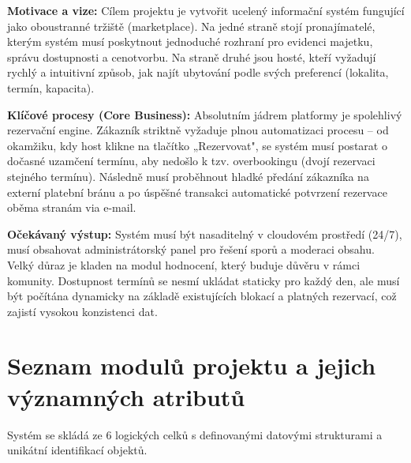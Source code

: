 \documentclass[11pt, a4paper]{article}
\begin{document}
\textbf{Motivace a vize:}
Cílem projektu je vytvořit ucelený informační systém fungující jako oboustranné tržiště (marketplace). Na jedné straně stojí pronajímatelé, kterým systém musí poskytnout jednoduché rozhraní pro evidenci majetku, správu dostupnosti a cenotvorbu. Na straně druhé jsou hosté, kteří vyžadují rychlý a intuitivní způsob, jak najít ubytování podle svých preferencí (lokalita, termín, kapacita).

\textbf{Klíčové procesy (Core Business):}
Absolutním jádrem platformy je spolehlivý rezervační engine. Zákazník striktně vyžaduje plnou automatizaci procesu -- od okamžiku, kdy host klikne na tlačítko „Rezervovat", se systém musí postarat o dočasné uzamčení termínu, aby nedošlo k tzv. overbookingu (dvojí rezervaci stejného termínu). Následně musí proběhnout hladké předání zákazníka na externí platební bránu a po úspěšné transakci automatické potvrzení rezervace oběma stranám via e-mail.

\textbf{Očekávaný výstup:}
Systém musí být nasaditelný v cloudovém prostředí (24/7), musí obsahovat administrátorský panel pro řešení sporů a moderaci obsahu. Velký důraz je kladen na modul hodnocení, který buduje důvěru v rámci komunity. Dostupnost termínů se nesmí ukládat staticky pro každý den, ale musí být počítána dynamicky na základě existujících blokací a platných rezervací, což zajistí vysokou konzistenci dat.

\section{Seznam modulů projektu a jejich významných atributů}

Systém se skládá ze 6 logických celků s definovanými datovými strukturami a unikátní identifikací objektů.
\end{document}
